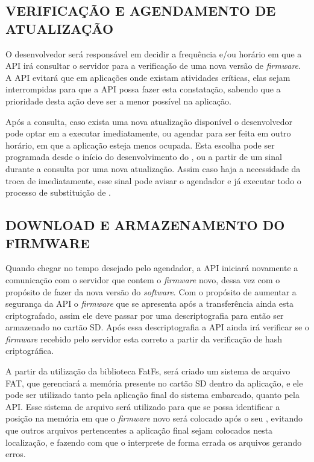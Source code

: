 
\subsection{VERIFICAÇÃO E AGENDAMENTO DE ATUALIZAÇÃO}

O desenvolvedor será responsável em decidir a frequência e/ou horário em que a API irá consultar o servidor para a verificação de uma nova versão de \textit{firmware}. A API evitará que em aplicações onde existam atividades críticas, elas sejam interrompidas para que a API possa fazer esta constatação, sabendo que a prioridade desta ação deve ser a menor possível na aplicação.

Após a consulta, caso exista uma nova atualização disponível o desenvolvedor pode optar em a executar imediatamente, ou agendar para ser feita em outro horário, em que a aplicação esteja menos ocupada. Esta escolha pode ser programada desde o início do desenvolvimento do \firmware, ou a partir de um sinal durante a consulta por uma nova atualização. Assim caso haja a necessidade da troca de \software imediatamente, esse sinal pode avisar o agendador e já executar todo o processo de substituição de \firmware. 

\subsection{DOWNLOAD E ARMAZENAMENTO DO FIRMWARE}

Quando chegar no tempo desejado pelo agendador, a API iniciará novamente a comunicação com o servidor que contem o \textit{firmware} novo, dessa vez com o propósito de fazer \download da nova versão do \textit{software}. Com o propósito de aumentar a segurança da API o \textit{firmware} que se apresenta após a transferência ainda esta criptografado, assim ele deve passar por uma descriptografia para então ser armazenado no cartão SD. Após essa descriptografia a API ainda irá verificar se o \textit{firmware} recebido pelo servidor esta correto a partir da verificação de hash criptográfica. 

A partir da utilização da biblioteca FatFs, será criado um sistema de arquivo FAT, que gerenciará a memória presente no cartão SD dentro da aplicação, e ele pode ser utilizado tanto pela aplicação final do sistema embarcado, quanto pela API. Esse sistema de arquivo será utilizado para que se possa identificar a posição na memória em que o \textit{firmware} novo será colocado após o seu \download, evitando que outros arquivos pertencentes a aplicação final sejam colocados nesta localização, e fazendo com que o \bootloader interprete de forma errada os arquivos gerando erros.

